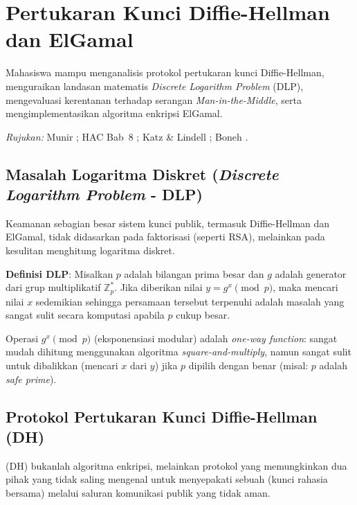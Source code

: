 \section{Pertukaran Kunci Diffie-Hellman dan ElGamal}

\begin{subcpmk}
  \item Mahasiswa mampu menganalisis protokol pertukaran kunci Diffie-Hellman, menguraikan landasan matematis \textit{Discrete Logarithm Problem} (DLP), mengevaluasi kerentanan terhadap serangan \textit{Man-in-the-Middle}, serta mengimplementasikan algoritma enkripsi ElGamal.
\end{subcpmk}

\noindent\textit{Rujukan:} Munir \cite{munir2019,munir_slides_itb}; HAC Bab~8 \cite{hac_online}; Katz \& Lindell \cite{katz2020}; Boneh \cite{boneh_cs255}.

\subsection{Masalah Logaritma Diskret (\textit{Discrete Logarithm Problem} - DLP)}

Keamanan sebagian besar sistem kunci publik, termasuk Diffie-Hellman dan ElGamal, tidak didasarkan pada faktorisasi (seperti RSA), melainkan pada kesulitan menghitung logaritma diskret.

\textbf{Definisi DLP}: Misalkan $p$ adalah bilangan prima besar dan $g$ adalah generator dari grup multiplikatif $\mathbb{Z}_p^*$. Jika diberikan nilai $y = g^x \pmod{p}$, maka mencari nilai $x$ sedemikian sehingga persamaan tersebut terpenuhi adalah masalah yang sangat sulit secara komputasi apabila $p$ cukup besar.

Operasi $g^x \pmod{p}$ (eksponensiasi modular) adalah \textit{one-way function}: sangat mudah dihitung menggunakan algoritma \textit{square-and-multiply}, namun sangat sulit untuk dibalikkan (mencari $x$ dari $y$) jika $p$ dipilih dengan benar (misal: $p$ adalah \textit{safe prime}).

\subsection{Protokol Pertukaran Kunci Diffie-Hellman (DH)}

 (DH) bukanlah algoritma enkripsi, melainkan protokol yang memungkinkan dua pihak yang tidak saling mengenal untuk menyepakati sebuah  (kunci rahasia bersama) melalui saluran komunikasi publik yang tidak aman.

